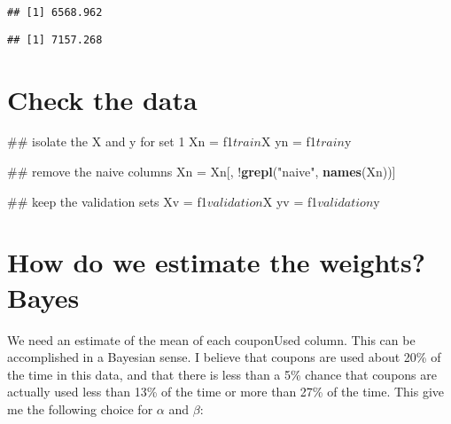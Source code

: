 \documentclass[10pt]{report}
\newenvironment{Shaded}{}{}
\newcommand{\KeywordTok}[1]{\textcolor[rgb]{0.00,0.44,0.13}{\textbf{{#1}}}}
\newcommand{\DecValTok}[1]{\textcolor[rgb]{0.25,0.63,0.44}{{#1}}}
\newcommand{\StringTok}[1]{\textcolor[rgb]{0.25,0.44,0.63}{{#1}}}
\newcommand{\NormalTok}[1]{{#1}}
\begin{document}
\begin{verbatim}
## [1] 6568.962
\end{verbatim}

\begin{Shaded}
\end{Shaded}

\begin{verbatim}
## [1] 7157.268
\end{verbatim}

\section{Check the data}\label{check-the-data}

\begin{Shaded}
\begin{Highlighting}[]
\NormalTok{## isolate the X and y for set 1}
\NormalTok{Xn =}\StringTok{ }\NormalTok{f1$train$X}
\NormalTok{yn =}\StringTok{ }\NormalTok{f1$train$y}

\NormalTok{## remove the naive columns}
\NormalTok{Xn =}\StringTok{ }\NormalTok{Xn[, !}\KeywordTok{grepl}\NormalTok{(}\StringTok{"naive"}\NormalTok{, }\KeywordTok{names}\NormalTok{(Xn))]}

\NormalTok{## keep the validation sets}
\NormalTok{Xv =}\StringTok{ }\NormalTok{f1$validation$X}
\NormalTok{yv =}\StringTok{ }\NormalTok{f1$validation$y}
\end{Highlighting}
\end{Shaded}

\section{How do we estimate the weights?
Bayes}\label{how-do-we-estimate-the-weights-bayes}

We need an estimate of the mean of each couponUsed column. This can be
accomplished in a Bayesian sense. I believe that coupons are used about
20\% of the time in this data, and that there is less than a 5\% chance
that coupons are actually used less than 13\% of the time or more than
27\% of the time. This give me the following choice for \(\alpha\) and
\(\beta\):
\end{document}
